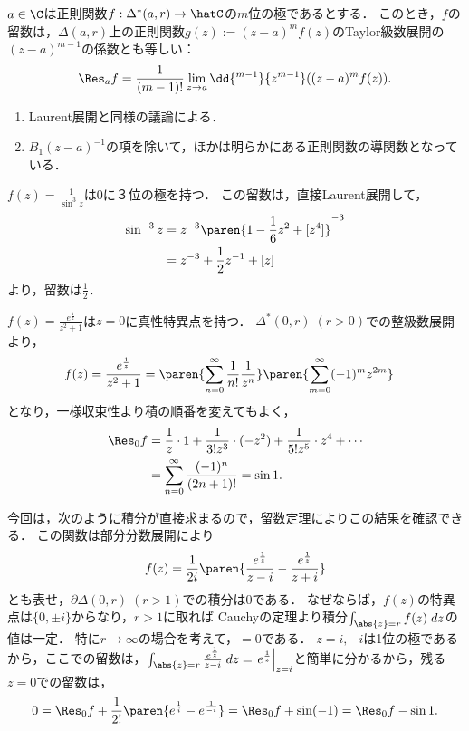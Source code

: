 \documentclass[uplatex, dvipdfmx]{jsreport}
\begin{document}
\begin{proposition}[極での留数は押し出した正則関数のTaylor展開係数と見れる]
    $a\in\C$は正則関数$f:\Delta^*(a,r)\to\hatC$の$m$位の極であるとする．
    このとき，$f$の留数は，$\Delta(a,r)$上の正則関数$g(z):=(z-a)^mf(z)$のTaylor級数展開の$(z-a)^{m-1}$の係数とも等しい：
    \[\Res_af=\frac{1}{(m-1)!}\lim_{z\to a}\dd{^{m-1}}{z^{m-1}}((z-a)^mf(z)).\]
\end{proposition}
\begin{Proof}\mbox{}
    \begin{enumerate}
        \item Laurent展開と同様の議論による．
        \item $B_1(z-a)^{-1}$の項を除いて，ほかは明らかにある正則関数の導関数となっている．
    \end{enumerate}
\end{Proof}

\begin{example}[Laurent展開を考える方が速い例]
    $f(z)=\frac{1}{\sin^3z}$は$0$に３位の極を持つ．
    この留数は，直接Laurent展開して，
    \begin{align*}
        \sin^{-3}z&=z^{-3}\paren{1-\frac{1}{6}z^2+[z^4]}^{-3}\\
        &=z^{-3}+\frac{1}{2}z^{-1}+[z]
    \end{align*}
    より，留数は$\frac{1}{2}$．
\end{example}

\begin{example}[真性特異点の留数]
    $f(z)=\frac{e^{\frac{1}{z}}}{z^2+1}$は$z=0$に真性特異点を持つ．
    $\Delta^*(0,r)\;(r>0)$での整級数展開より，
    \begin{align*}
        f(z)&=\frac{e^{\frac{1}{z}}}{z^2+1}=\paren{\sum^\infty_{n=0}\frac{1}{n!}\frac{1}{z^n}}\paren{\sum^\infty_{m=0}(-1)^mz^{2m}}
    \end{align*}
    となり，一様収束性より積の順番を変えてもよく，
    \begin{align*}
        \Res_0f&=\frac{1}{z}\cdot 1+\frac{1}{3!z^3}\cdot(-z^2)+\frac{1}{5!z^5}\cdot z^4+\cdots\\
        &=\sum^\infty_{n=0}\frac{(-1)^n}{(2n+1)!}=\sin 1.
    \end{align*}
\end{example}
\begin{remark}
    今回は，次のように積分が直接求まるので，留数定理によりこの結果を確認できる．
    この関数は部分分数展開により\[f(z)=\frac{1}{2i}\paren{\frac{e^{\frac{1}{z}}}{z-i}-\frac{e^{\frac{1}{z}}}{z+i}}\]
    とも表せ，$\partial\Delta(0,r)\;(r>1)$での積分は$0$である．
    なぜならば，$f(z)$の特異点は$\{0,\pm i\}$からなり，$r>1$に取れば
    Cauchyの定理より積分$\int_{\abs{z}=r}f(z)\;dz$の値は一定．
    特に$r\to\infty$の場合を考えて，$=0$である．
    $z=i,-i$は1位の極であるから，ここでの留数は，$\int_{\abs{z}=r}\frac{e^{\frac{1}{z}}}{z-i}\;dz=\left.e^{\frac{1}{z}}\right|_{z=i}$と簡単に分かるから，残る$z=0$での留数は，
    \begin{align*}
        0=\Res_0f+\frac{1}{2!}\paren{e^{\frac{1}{i}}-e^{\frac{1}{-i}}}=\Res_0f+\sin (-1)=\Res_0f-\sin 1.
    \end{align*}
\end{remark}
\end{document}
